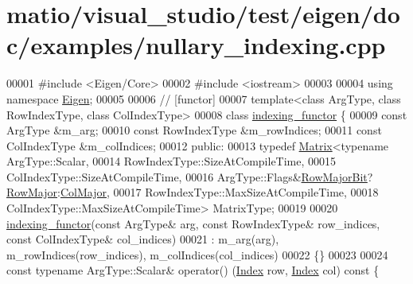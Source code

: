 \hypertarget{matio_2visual__studio_2test_2eigen_2doc_2examples_2nullary__indexing_8cpp_source}{}\section{matio/visual\+\_\+studio/test/eigen/doc/examples/nullary\+\_\+indexing.cpp}
\label{matio_2visual__studio_2test_2eigen_2doc_2examples_2nullary__indexing_8cpp_source}

\begin{DoxyCode}
00001 \textcolor{preprocessor}{#include <Eigen/Core>}
00002 \textcolor{preprocessor}{#include <iostream>}
00003 
00004 \textcolor{keyword}{using namespace }\hyperlink{namespace_eigen}{Eigen};
00005 
00006 \textcolor{comment}{// [functor]}
00007 \textcolor{keyword}{template}<\textcolor{keyword}{class} ArgType, \textcolor{keyword}{class} RowIndexType, \textcolor{keyword}{class} ColIndexType>
00008 \textcolor{keyword}{class }\hyperlink{classindexing__functor}{indexing\_functor} \{
00009   \textcolor{keyword}{const} ArgType &m\_arg;
00010   \textcolor{keyword}{const} RowIndexType &m\_rowIndices;
00011   \textcolor{keyword}{const} ColIndexType &m\_colIndices;
00012 \textcolor{keyword}{public}:
00013   \textcolor{keyword}{typedef} \hyperlink{group___core___module_class_eigen_1_1_matrix}{Matrix}<\textcolor{keyword}{typename} ArgType::Scalar,
00014                  RowIndexType::SizeAtCompileTime,
00015                  ColIndexType::SizeAtCompileTime,
00016                  ArgType::Flags&\hyperlink{group__flags_gae4f56c2a60bbe4bd2e44c5b19cbe8762}{RowMajorBit}?\hyperlink{group__enums_ggaacded1a18ae58b0f554751f6cdf9eb13acfcde9cd8677c5f7caf6bd603666aae3}{RowMajor}:\hyperlink{group__enums_ggaacded1a18ae58b0f554751f6cdf9eb13a0cbd4bdd0abcfc0224c5fcb5e4f6669a}{ColMajor},
00017                  RowIndexType::MaxSizeAtCompileTime,
00018                  ColIndexType::MaxSizeAtCompileTime> MatrixType;
00019 
00020   \hyperlink{classindexing__functor}{indexing\_functor}(\textcolor{keyword}{const} ArgType& arg, \textcolor{keyword}{const} RowIndexType& row\_indices, \textcolor{keyword}{const} ColIndexType&
       col\_indices)
00021     : m\_arg(arg), m\_rowIndices(row\_indices), m\_colIndices(col\_indices)
00022   \{\}
00023 
00024   \textcolor{keyword}{const} \textcolor{keyword}{typename} ArgType::Scalar& operator() (\hyperlink{namespace_eigen_a62e77e0933482dafde8fe197d9a2cfde}{Index} row, \hyperlink{namespace_eigen_a62e77e0933482dafde8fe197d9a2cfde}{Index} col)\textcolor{keyword}{ const }\{

\end{DoxyCode}
